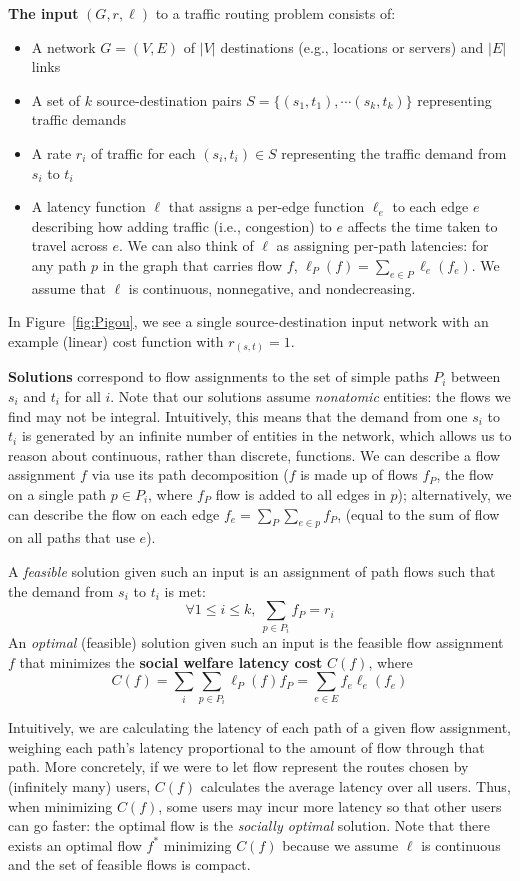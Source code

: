 \medskip\noindent
\textbf{The input} $(G,r,\ell)$ to a traffic routing problem consists of:
\begin{itemize}
    \item A network $G = (V, E)$ of $|V|$ destinations (e.g., locations or servers) and $|E|$ links 
     \item A set of $k$ source-destination pairs $S=\{(s_1,t_1), \cdots (s_k,t_k)\}$ representing traffic demands
    \item A {rate} $r_i$ of traffic for each $(s_i,t_i)\in S$ representing the traffic demand from $s_i$ to $t_i$
    \item A {latency} function $\ell$ that assigns a per-edge function $\ell_e$ to each edge $e$ describing how adding traffic (i.e., congestion) to $e$ affects the time taken to travel across $e$. We can also think of $\ell$ as assigning per-path latencies: for any path $p$ in the graph that carries flow $f$,
        $\ell_P(f) = \sum_{e\in P}\ell_e(f_e)$.
        We assume that $\ell$ is continuous, nonnegative, and nondecreasing.
\end{itemize}
In Figure~\ref{fig:Pigou}, we see a single source-destination input network with an example (linear) cost function with $r_{(s,t)} = 1$.

\medskip\noindent
\textbf{Solutions} correspond to flow assignments to the set of simple paths $P_i$ between $s_i$ and $t_i$ for all $i$. Note that our solutions assume \emph{nonatomic} entities: the flows we find may not be integral.
Intuitively, this means that the demand from one $s_i$ to $t_i$ is generated by an infinite number
of entities in the network, which allows us to reason about continuous, rather than discrete, functions.
%
We can describe a flow assignment $f$ via use its path decomposition ($f$ is made up of flows $f_P$, the flow on a single path $p \in P_i$, where $f_P$ flow is added to all edges in $p$); alternatively, we can describe the flow on each edge $f_e = \sum_P \sum_{e\in p} f_P$, (equal to the sum of flow on all paths that use $e$).

A \emph{feasible} solution given such an input is an assignment of path flows such that the demand from $s_i$ to $t_i$ is met:
$$\forall 1 \le i \le k,~\sum_{p\in P_i} f_P = r_i$$
%
An \emph{optimal} (feasible) solution given such an input is the feasible flow assignment $f$ that minimizes the \textbf{social welfare latency cost} $C(f)$, where
$$C(f) = \sum_i\sum_{p\in P_i}\ell_P(f)f_P = \sum_{e\in E} f_e\ell_e(f_e)$$

Intuitively, we are calculating the latency of each path of a given flow assignment, weighing 
each path's latency proportional to the amount of flow through that path. More concretely,
if we were to let flow represent the routes chosen by (infinitely many) users, $C(f)$ calculates the average latency over all users. Thus, when minimizing $C(f)$, some users may incur 
more latency so that other users can go faster: the optimal flow is the \emph{socially optimal} solution.
Note that there exists an optimal flow $f^*$ minimizing $C(f)$ because we assume $\ell$ is continuous and the set of feasible flows is compact.

